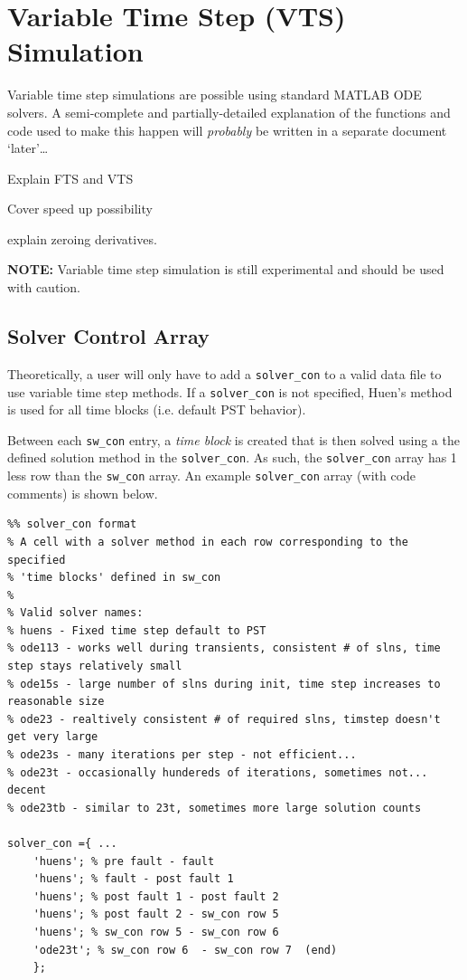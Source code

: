 \section{Variable Time Step (VTS) Simulation}  
Variable time step simulations are possible using standard MATLAB ODE solvers.
A semi-complete and partially-detailed explanation of the functions and code used to make this happen will \emph{probably} be written in a separate document `later'\ldots

Explain FTS and VTS

Cover speed up possibility

explain zeroing derivatives.

\textbf{NOTE:} Variable time step simulation is still experimental and should be used with caution.


\subsection{Solver Control Array}  
Theoretically, a user will only have to add a \verb|solver_con| to a valid data file to use variable time step methods.
If a \verb|solver_con| is not specified, Huen's method is used for all time blocks (i.e. default PST behavior).

Between each \verb|sw_con| entry, a \emph{time block} is created that is then solved using a the defined solution method in the \verb|solver_con|.
As such, the \verb|solver_con| array has 1 less row than the \verb|sw_con| array.
An example \verb|solver_con| array (with code comments) is shown below.
\begin{verbatim}
%% solver_con format
% A cell with a solver method in each row corresponding to the specified
% 'time blocks' defined in sw_con
%
% Valid solver names:
% huens - Fixed time step default to PST
% ode113 - works well during transients, consistent # of slns, time step stays relatively small
% ode15s - large number of slns during init, time step increases to reasonable size
% ode23 - realtively consistent # of required slns, timstep doesn't get very large
% ode23s - many iterations per step - not efficient...
% ode23t - occasionally hundereds of iterations, sometimes not... decent
% ode23tb - similar to 23t, sometimes more large solution counts

solver_con ={ ...
    'huens'; % pre fault - fault
    'huens'; % fault - post fault 1
    'huens'; % post fault 1 - post fault 2
    'huens'; % post fault 2 - sw_con row 5
    'huens'; % sw_con row 5 - sw_con row 6 
    'ode23t'; % sw_con row 6  - sw_con row 7  (end)
    };
\end{verbatim}

